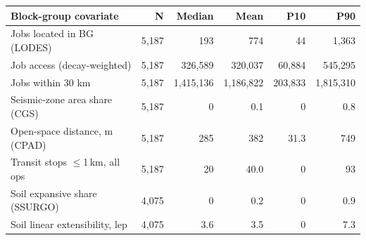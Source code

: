 \begin{tabular}{lrrrrr}
\toprule
Block-group covariate & N & Median & Mean & P10 & P90 \\
\midrule
Jobs located in BG (LODES) & 5,187 & 193 & 774 & 44 & 1,363 \\
Job access (decay-weighted) & 5,187 & 326,589 & 320,037 & 60,884 & 545,295 \\
Jobs within 30 km & 5,187 & 1,415,136 & 1,186,822 & 203,833 & 1,815,310 \\
Seismic-zone area share (CGS) & 5,187 & 0 & 0.1 & 0 & 0.8 \\
Open-space distance, m (CPAD) & 5,187 & 285 & 382 & 31.3 & 749 \\
Transit stops $\leq$1\,km, all ops & 5,187 & 20 & 40.0 & 0 & 93 \\
Soil expansive share (SSURGO) & 4,075 & 0 & 0.2 & 0 & 0.9 \\
Soil linear extensibility, lep & 4,075 & 3.6 & 3.5 & 0 & 7.3 \\
\bottomrule
\end{tabular}
